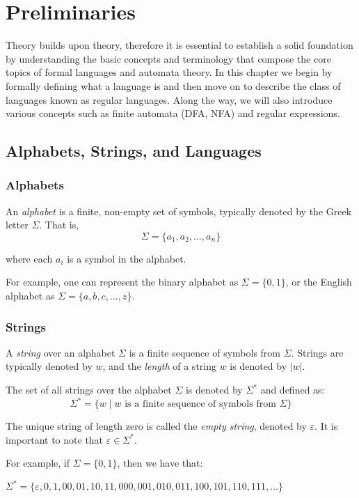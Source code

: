 \chapter{Preliminaries}\label{chap:prelim}
Theory builds upon theory, therefore it is essential to establish a solid foundation by understanding the basic concepts and terminology that compose the core topics of formal languages and automata theory.
In this chapter we begin by formally defining what a language is and then move on to describe the class of languages known as regular languages.
Along the way, we will also introduce various concepts such as finite automata (DFA, NFA) and regular expressions.

\section{Alphabets, Strings, and Languages}
\subsection*{Alphabets}

An \emph{alphabet} is a finite, non-empty set of symbols, typically denoted by the Greek letter $\Sigma$. That is,
\[
\Sigma = \{ a_1, a_2, \dots, a_n \}
\]

\noindent where each $a_i$ is a symbol in the alphabet.

For example, one can represent the binary alphabet as $\Sigma = \{ 0, 1 \}$, or the English alphabet as $\Sigma = \{ a, b, c, \ldots, z \}$.

\subsection*{Strings}
A \emph{string} over an alphabet $\Sigma$ is a finite sequence of symbols from $\Sigma$. Strings are typically denoted by $w$, and the \emph{length} of a string $w$ is denoted by $|w|$.

The set of all strings over the alphabet $\Sigma$ is denoted by $\Sigma^*$ and defined as:
\[
\Sigma^* = \{ w \mid w \text{ is a finite sequence of symbols from } \Sigma \}
\]

The unique string of length zero is called the \emph{empty string}, denoted by $\varepsilon$.
It is important to note that $\varepsilon \in \Sigma^*$.

For example, if $\Sigma = \{ 0, 1 \}$, then we have that:
\begin{center}
	$\Sigma^* = \{ \varepsilon, 0, 1, 00, 01, 10, 11, 000, 001, 010, 011, 100, 101, 110, 111, \ldots \}$
\end{center}

